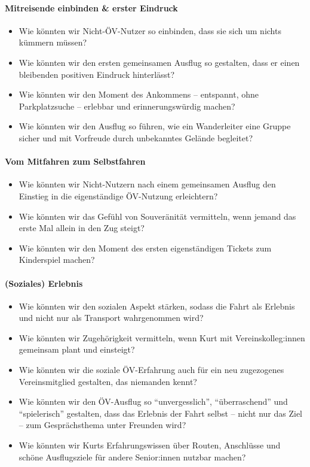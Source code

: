 \paragraph{Mitreisende einbinden \& erster Eindruck}
\begin{itemize}[nosep]
  \item Wie könnten wir Nicht-ÖV-Nutzer so einbinden, dass sie sich um nichts kümmern müssen?
  \item Wie könnten wir den ersten gemeinsamen Ausflug so gestalten, dass er einen bleibenden positiven Eindruck hinterlässt?
  \item Wie könnten wir den Moment des Ankommens -- entspannt, ohne Parkplatzsuche -- erlebbar und erinnerungswürdig machen?
  \item Wie könnten wir den Ausflug so führen, wie ein Wanderleiter eine Gruppe sicher und mit Vorfreude durch unbekanntes Gelände begleitet?
\end{itemize}

\paragraph{Vom Mitfahren zum Selbstfahren}
\begin{itemize}[nosep]
  \item Wie könnten wir Nicht-Nutzern nach einem gemeinsamen Ausflug den Einstieg in die eigenständige ÖV-Nutzung erleichtern?
  \item Wie könnten wir das Gefühl von Souveränität vermitteln, wenn jemand das erste Mal allein in den Zug steigt?
  \item Wie könnten wir den Moment des ersten eigenständigen Tickets zum Kinderspiel machen?
\end{itemize}

\paragraph{(Soziales) Erlebnis}
\begin{itemize}[nosep]
  \item Wie könnten wir den sozialen Aspekt stärken, sodass die Fahrt als Erlebnis und nicht nur als Transport wahrgenommen wird?
  \item Wie könnten wir Zugehörigkeit vermitteln, wenn Kurt mit Vereinskolleg:innen gemeinsam plant und einsteigt?
  \item Wie könnten wir die soziale ÖV-Erfahrung auch für ein neu zugezogenes Vereinsmitglied gestalten, das niemanden kennt?
  \item Wie könnten wir den ÖV-Ausflug so \enquote{unvergesslich}, \enquote{überraschend} und \enquote{spielerisch} gestalten, dass das Erlebnis der Fahrt selbst -- nicht nur das Ziel -- zum Gesprächsthema unter Freunden wird?
  \item Wie könnten wir Kurts Erfahrungswissen über Routen, Anschlüsse und schöne Ausflugsziele für andere Senior:innen nutzbar machen?
\end{itemize}


